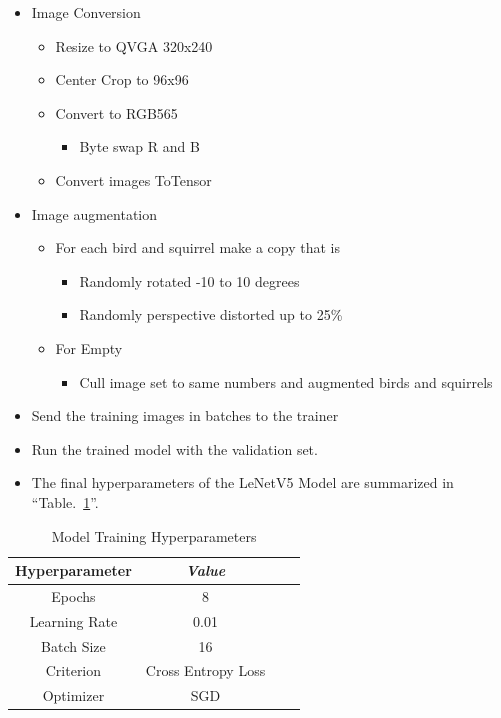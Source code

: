 \documentclass[conference]{IEEEtran}
\begin{document}
\begin{itemize}
	\item Image Conversion
	\begin{itemize}
		\item Resize to QVGA 320x240
		\item Center Crop to 96x96
		\item Convert to RGB565
		\begin{itemize}
			\item Byte swap R and B
		\end{itemize}
		\item Convert images ToTensor
	\end{itemize}
	\item Image augmentation
	\begin{itemize}
		\item For each bird and squirrel make a copy that is
		\begin{itemize}
			\item Randomly rotated -10 to 10 degrees
			\item Randomly perspective distorted up to 25\%
		\end{itemize}
		\item For Empty
		\begin{itemize}
			\item Cull image set to same numbers and augmented birds and squirrels
		\end{itemize}
	\end{itemize}
	\item Send the training images in batches to the trainer
	\item Run the trained model with the validation set.
	\item The final hyperparameters of the  LeNetV5 \cite{leNet} Model are summarized in ``Table.~\ref{hyperparameters}''.
\end{itemize}

\begin{table}[htbp]
\caption{Model Training Hyperparameters}
\begin{center}
\begin{tabular}{|c|c|c|c|}
\hline

\textbf{Hyperparameter} & \textbf{\textit{Value}}    \\ \hline 
Epochs& 8 \\ \hline 
Learning Rate& 0.01 \\ \hline 
Batch Size& 16 \\ \hline 
Criterion& Cross Entropy Loss \\ \hline 
Optimizer& SGD \\ \hline 
\end{tabular}
\label{hyperparameters}
\end{center}
\end{table}
\end{document}
